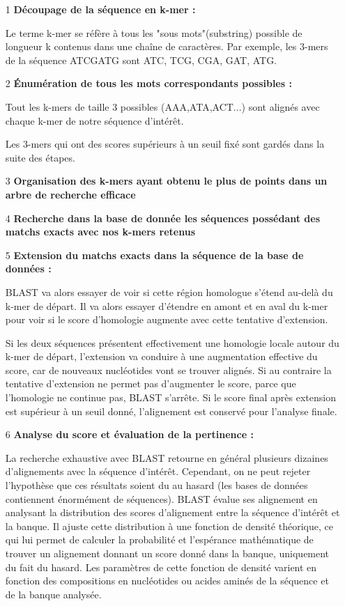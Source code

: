 \documentclass{article}
\begin{document}
\begin{itemize}
\item[1] \textbf{Découpage de la séquence en k-mer :}

Le terme k-mer se réfère à tous les "sous mots"(substring) possible de longueur k contenus dans une chaîne de caractères. Par exemple, les 3-mers de la séquence ATCGATG sont ATC, TCG, CGA, GAT, ATG.

\item[2] \textbf{Énumération de tous les mots correspondants possibles :}

Tout les k-mers de taille 3 possibles (AAA,ATA,ACT...) sont alignés avec chaque k-mer de notre séquence d'intérêt. 

Les 3-mers qui ont des scores supérieurs à un seuil fixé sont gardés dans la suite des étapes.

\item[3] \textbf{Organisation des k-mers ayant obtenu le plus de points dans un arbre de recherche efficace}

\item[4] \textbf{Recherche dans la base de donnée les séquences possédant des matchs exacts avec nos k-mers retenus}

\item[5] \textbf{Extension du matchs exacts dans la séquence de la base de données :}

BLAST va alors essayer de voir si cette région homologue s'étend au-delà du k-mer de départ. Il va alors essayer d'étendre en amont et en aval du k-mer pour voir si le score d'homologie augmente avec cette tentative d'extension.

Si les deux séquences présentent effectivement une homologie locale autour du k-mer de départ, l'extension va conduire à une augmentation effective du score, car de nouveaux nucléotides vont se trouver alignés. Si au contraire la tentative d'extension ne permet pas d'augmenter le score, parce que l'homologie ne continue pas, BLAST s'arrête. Si le score final après extension est supérieur à un seuil donné, l'alignement est conservé pour l'analyse finale.

\item[6] \textbf{Analyse du score et évaluation de la pertinence :}

La recherche exhaustive avec BLAST retourne en général plusieurs dizaines d'alignements avec la séquence d'intérêt. Cependant, on ne peut rejeter l'hypothèse que ces résultats soient du au hasard (les bases de données contiennent énormément de séquences). BLAST évalue ses alignement en analysant la distribution des scores d'alignement entre la séquence d'intérêt et la banque. Il ajuste cette distribution à une fonction de densité théorique, ce qui lui permet de calculer la probabilité et l'espérance mathématique de trouver un alignement donnant un score donné dans la banque, uniquement du fait du hasard. Les paramètres de cette fonction de densité varient en fonction des compositions en nucléotides ou acides aminés de la séquence et de la banque analysée.
\end{itemize}
\end{document}
